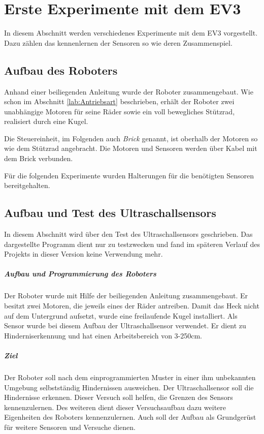 \chapter{Erste Experimente mit dem EV3}
In diesem Abschnitt werden verschiedenes Experimente mit dem EV3 vorgestellt. Dazu zählen das kennenlernen der Sensoren so wie deren Zusammenspiel.
\section{Aufbau des Roboters} 
Anhand einer beiliegenden Anleitung wurde der Roboter zusammengebaut. Wie schon im Abschnitt \vref{lab:Antriebsart} beschrieben, erhält der Roboter zwei unabhängige Motoren für seine Räder sowie ein voll bewegliches Stützrad, realisiert durch eine Kugel.

Die Steuereinheit, im Folgenden auch \textit{Brick} genannt, ist oberhalb der Motoren so wie dem Stützrad angebracht. Die Motoren und Sensoren werden über Kabel mit dem Brick verbunden. 

Für die folgenden Experimente wurden Halterungen für die benötigten Sensoren bereitgehalten.   
   
\section{Aufbau und Test des Ultraschallsensors}
In diesem Abschnitt wird über den Test des Ultraschallsensors geschrieben. Das dargestellte Programm dient nur zu testzwecken und fand im späteren Verlauf des Projekts in dieser Version keine Verwendung mehr.
\paragraph{Aufbau und Programmierung des Roboters}
Der Roboter wurde mit Hilfe der beiliegenden Anleitung zusammengebaut. Er besitzt zwei Motoren, die jeweils eines der Räder antreiben. Damit das Heck nicht auf dem Untergrund aufsetzt, wurde eine freilaufende Kugel installiert. 
Als Sensor wurde bei diesem Aufbau der Ultraschallsensor verwendet. Er dient zu Hinderniserkennung und hat einen Arbeitsbereich von 3-250cm.

\paragraph{Ziel}
Der Roboter soll nach dem einprogrammierten Muster in einer ihm unbekannten Umgebung selbstständig Hindernissen ausweichen. Der Ultraschallsensor soll die Hindernisse erkennen. Dieser Versuch soll helfen, die Grenzen des Sensors kennenzulernen. Des weiteren dient dieser Versuchsaufbau dazu weitere Eigenheiten des Roboters kennenzulernen. Auch soll der Aufbau als Grundgerüst für weitere Sensoren und Versuche dienen.  

